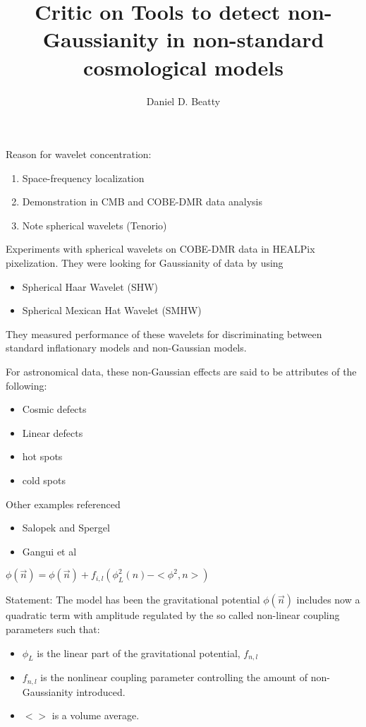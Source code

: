 \documentclass[11pt]{article}
\title{Critic on Tools to detect non-Gaussianity in non-standard cosmological models}
\author{Daniel D. Beatty}
\begin{document}
\maketitle

Reason for wavelet concentration:
\begin{enumerate}
\item Space-frequency localization
\item Demonstration in CMB and COBE-DMR data analysis
\item Note spherical wavelets (Tenorio)
\end{enumerate}

Experiments with spherical wavelets on COBE-DMR data in HEALPix pixelization.  They were looking for Gaussianity of data by using 
\begin{itemize}
\item Spherical Haar Wavelet (SHW)
\item Spherical Mexican Hat Wavelet (SMHW)
\end{itemize}

They measured performance of these wavelets for discriminating between standard inflationary models and non-Gaussian models.  

For astronomical data, these non-Gaussian effects are said to be attributes of the following:
\begin{itemize}
\item Cosmic defects
\item Linear defects
\item hot spots 
\item cold spots
\end{itemize}

Other examples referenced 
\begin{itemize}
\item Salopek and Spergel
\item Gangui et al
\end{itemize}

$\phi(\vec{n}) = \phi (\vec{n}) +f_{i,l}(\phi^2_L (n) - <\phi^2,n>) $

Statement: The model has been the gravitational potential $ \phi(\vec{n})$ includes now a quadratic term with amplitude regulated by the so called non-linear coupling parameters such that:
\begin{itemize}
\item $\phi_L$ is the linear part of the gravitational potential, $f_{n,l}$
\item $f_{n,l}$ is the nonlinear coupling parameter controlling the amount of non-Gaussianity introduced.  
\item $<>$ is a volume average.
\end{itemize}
\end{document}

